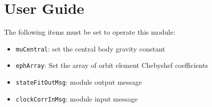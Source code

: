 
\section{User Guide}
The following items must be set to operate this module:
\begin{itemize}
	\item {\tt muCentral}: set the central body gravity constant
	\item {\tt ephArray}: Set the array of orbit element Chebyshef coefficients
	\item {\tt stateFitOutMsg}: module output message 
	\item {\tt clockCorrInMsg}: module input message 
\end{itemize}